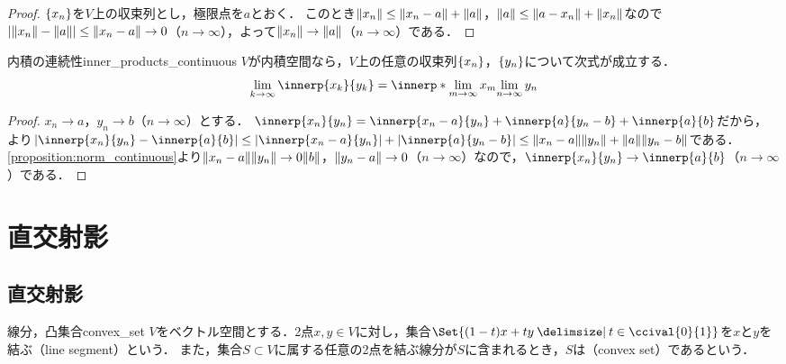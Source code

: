 \documentclass[../../main]{subfiles}
\begin{document}
\begin{proof}
  \(\lbrace x_n\rbrace\)を\(V\)上の収束列とし，極限点を\(a\)とおく．
  このとき\(\lVert x_n\rVert\leq\lVert x_n-a\rVert+\lVert a\rVert\)，\(\lVert a\rVert\leq\lVert a-x_n\rVert+\lVert x_n\rVert\)なので
  \(\lvert\lVert x_n\rVert-\lVert a\rVert\rvert\leq\lVert x_n-a\rVert\to 0\)（\(n\to\infty\)），よって\(\lVert x_n\rVert\to\lVert a\rVert\)（\(n\to\infty\)）である．
\end{proof}

\begin{proposition}{内積の連続性}{inner_products_continuous}
  \(V\)が内積空間なら，\(V\)上の任意の収束列\(\lbrace x_n\rbrace\)，\(\lbrace y_n\rbrace\)について次式が成立する．
  \[
    \lim_{k\to\infty}\innerp{x_k}{y_k} = \innerp*{\lim_{m\to\infty}x_m}{\lim_{n\to\infty}y_n}
  \]
\end{proposition}

\begin{proof}
  \(x_n\to a\)，\(y_n\to b\)（\(n\to\infty\)）とする．
  \(\innerp{x_n}{y_n}=\innerp{x_n-a}{y_n}+\innerp{a}{y_n-b}+\innerp{a}{b}\)だから，
  より\(\abs{\innerp{x_n}{y_n}-\innerp{a}{b}}\leq\abs{\innerp{x_n-a}{y_n}}+\abs{\innerp{a}{y_n-b}}\leq\vnorm{x_n-a}\vnorm{y_n}+\vnorm{a}\vnorm{y_n-b}\)である．
  \cref{proposition:norm_continuous}より\(\lVert x_n-a\rVert\lVert y_n\rVert\to 0\lVert b\rVert\)，\(\lVert y_n-a\rVert\to 0\)（\(n\to\infty\)）なので，\(\innerp{x_n}{y_n}\to\innerp{a}{b}\)（\(n\to\infty\)）である．
\end{proof}

\section{直交射影}

\subsection{直交射影}

\begin{definition}{線分，凸集合}{convex_set}
  \(V\)をベクトル空間とする．2点\(x,y\in V\)に対し，集合\(\Set{(1-t)x+ty\given t\in\ccival{0}{1}}\)を\(x\)と\(y\)を結ぶ（line segment）という．
  また，集合\(S\subset V\)に属する任意の2点を結ぶ線分が\(S\)に含まれるとき，\(S\)は（convex set）であるという．
\end{definition}
\end{document}
